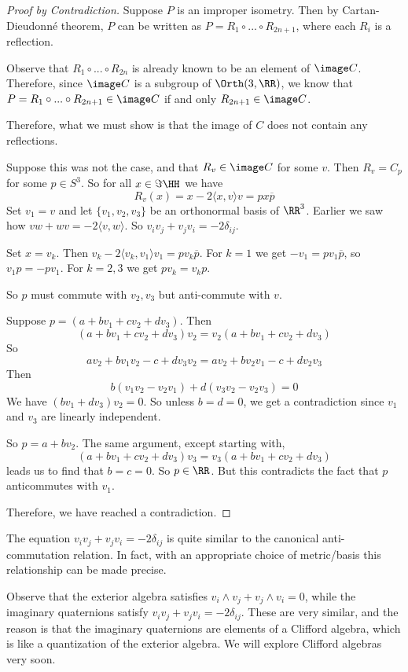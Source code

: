 \begin{proof}[Proof by Contradiction]
Suppose $P$ is an improper isometry. Then by Cartan-Dieudonn\'e theorem, $P$ can be written as $P = R_1\circ...\circ R_{2n+1}$, where each $R_i$ is a reflection. 

Observe that $R_1\circ...\circ R_{2n}$ is already known to be an element of $\image C$. Therefore, since $\image C$ is a subgroup of $\Orth(3,\RR)$, we know that $P =R_1\circ...\circ R_{2n+1} \in \image C $ if and only $R_{2n+1}\in \image C$. 

Therefore, what we must show is that the image of $C$ does not contain any reflections.

Suppose this was not the case, and that $R_v \in \image C$ for some $v$. Then $R_v = C_p$ for some $p \in S^3$. So for all $x \in \Im\HH$ we have \[R_v(x) = x-2\langle x,v\rangle v= px\overline{p}\]
Set $v_1=v$ and let $\{v_1,v_2,v_3\}$ be an orthonormal basis of $\RR^3$. Earlier we saw how $vw+wv=-2\langle v,w\rangle$. So $v_i v_j + v_j v_i = -2\delta_{ij}$.

Set $x = v_k$. Then $v_k-2\langle v_k,v_1\rangle v_1 = pv_k\overline{p}$. For $k=1$ we get $-v_1 = pv_1\overline{p}$, so $v_1p = -pv_1$. For $k=2,3$ we get $pv_k = v_k p$.

So $p$ must commute with $v_2,v_3$ but anti-commute with $v$. 

Suppose $p = (a+bv_1 + cv_2 + dv_3)$. Then
\[(a+bv_1+cv_2+dv_3)v_2 = v_2 (a+bv_1+cv_2+dv_3)\]
So \[av_2 + bv_1v_2 - c + dv_3v_2 = av_2 + bv_2v_1 -c + dv_2v_3\] Then \[b(v_1v_2-v_2v_1)+d(v_3v_2-v_2v_3)=0\]
We have $(bv_1+dv_3)v_2=0$. So unless $b=d=0$, we get a contradiction since $v_1$ and $v_3$ are linearly independent. 

So $p=a+bv_2$. The same argument, except starting with,
\[(a+bv_1+cv_2+dv_3)v_3 = v_3 (a+bv_1+cv_2+dv_3)\]
leads us to find that $b=c=0$. So $p \in \RR$. But this contradicts the fact that $p$ anticommutes with $v_1$.

Therefore, we have reached a contradiction.



\end{proof}
\begin{physics*}
    The equation $v_i v_j + v_j v_i = -2\delta_{ij}$ is quite similar to the canonical anti-commutation relation. In fact, with an appropriate choice of metric/basis this relationship can be made precise.
\end{physics*}
\begin{physics*}
    Observe that the exterior algebra satisfies $v_i\wedge v_j + v_j\wedge v_i = 0$, while the imaginary quaternions satisfy $v_iv_j+v_jv_i = -2\delta_{ij}$. These are very similar, and the reason is that the imaginary quaternions are elements of a Clifford algebra, which is like a quantization of the exterior algebra. We will explore Clifford algebras very soon.
\end{physics*}

